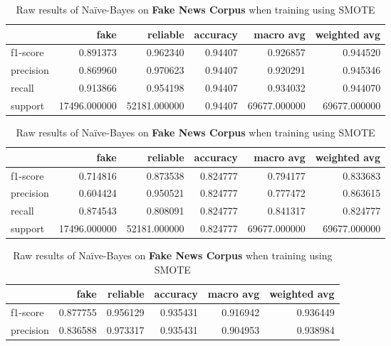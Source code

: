 \begin{table}
\begin{subtable}{\textwidth}
 \begin{tabular}{lrrrrr}
 \toprule
 {} &          fake &      reliable &  accuracy &     macro avg &  weighted avg \\
 \midrule
 f1-score  &      0.891373 &      0.962340 &   0.94407 &      0.926857 &      0.944520 \\
 precision &      0.869960 &      0.970623 &   0.94407 &      0.920291 &      0.945346 \\
 recall    &      0.913866 &      0.954198 &   0.94407 &      0.934032 &      0.944070 \\
 support   &  17496.000000 &  52181.000000 &   0.94407 &  69677.000000 &  69677.000000 \\
 \bottomrule
 \end{tabular}
 \caption{Raw results of linear svm on \textbf{Fake News Corpus} when training using SMOTE}
\end{subtable}
\begin{subtable}{\textwidth}
 \begin{tabular}{lrrrrr}
 \toprule
 {} &          fake &      reliable &  accuracy &     macro avg &  weighted avg \\
 \midrule
 f1-score  &      0.714816 &      0.873538 &  0.824777 &      0.794177 &      0.833683 \\
 precision &      0.604424 &      0.950521 &  0.824777 &      0.777472 &      0.863615 \\
 recall    &      0.874543 &      0.808091 &  0.824777 &      0.841317 &      0.824777 \\
 support   &  17496.000000 &  52181.000000 &  0.824777 &  69677.000000 &  69677.000000 \\
 \bottomrule
 \end{tabular}
 \caption{Raw results of Na\"{i}ve-Bayes on \textbf{Fake News Corpus} when training using SMOTE}
\end{subtable}
\begin{subtable}{\textwidth}
 \begin{tabular}{lrrrrr}
 \toprule
 {} &          fake &      reliable &  accuracy &     macro avg &  weighted avg \\
 \midrule
 f1-score  &      0.877755 &      0.956129 &  0.935431 &      0.916942 &      0.936449 \\
 precision &      0.836588 &      0.973317 &  0.935431 &      0.904953 &      0.938984 \\

\end{tabular}
\end{subtable}
\end{table}
